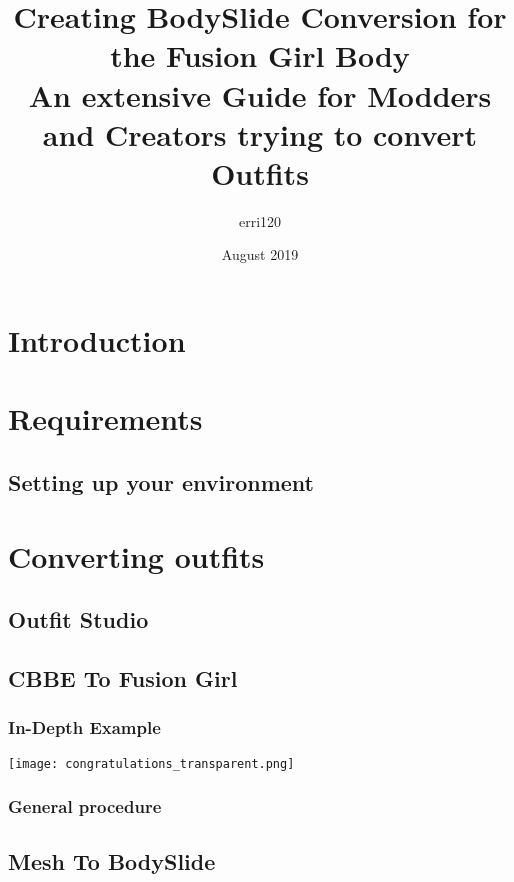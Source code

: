 \documentclass[12pt]{article}
\begin{document}
\pagecolor{bg}
\color{white}
\title{Creating BodySlide Conversion for the Fusion Girl Body\\[0.2em]\smaller{}
An extensive Guide for Modders and Creators trying to convert Outfits}
\author{erri120}
\date{August 2019}
\maketitle
\clearpage
\renewcommand{\cftsecfont}{\bfseries\color{white}}
\renewcommand{\cftsubsecfont}{\color{white}}
\renewcommand{\cftsubsubsecfont}{\color{white}}
\tableofcontents
\clearpage
\section{Introduction}

\section{Requirements}

\pagebreak
\subsection{Setting up your environment}

\pagebreak
\section{Converting outfits}
\subsection{Outfit Studio}

\pagebreak
\subsection{CBBE To Fusion Girl}
\subsubsection{In-Depth Example}

\texttt{[image: congratulations\_transparent.png]}
\pagebreak
\subsubsection{General procedure}

\pagebreak
\subsection{Mesh To BodySlide}
\end{document}
